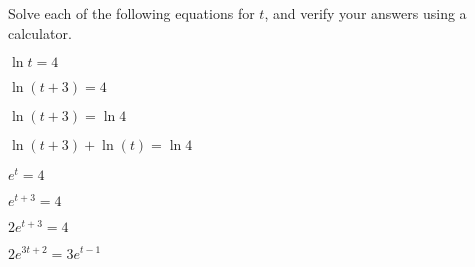 \begin{activity}\label{A:0.4.2}
    Solve each of the following equations for $t$, and verify your answers using a calculator.
	\ba
		\item $\ln t=4$
		\item $\ln(t+3)=4$
		\item $\ln(t+3)=\ln4$
		\item $\ln(t+3)+\ln(t)=\ln4$
		\item $e^{t}=4$
		\item $e^{t+3}=4$
		\item $2e^{t+3}=4$
		\item $2e^{3t+2}=3e^{t-1}$
	\ea

\end{activity}\aftera

